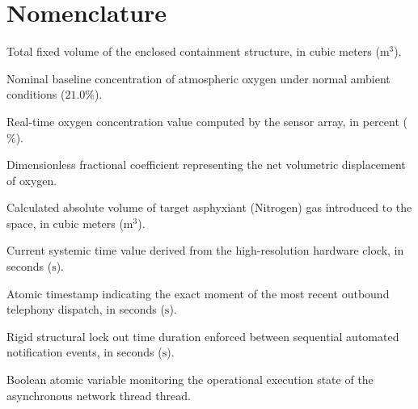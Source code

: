 \section{Nomenclature}
\label{sec:nomenclature}
\begin{list}{}{\setlength{\leftmargin}{1.5cm}\setlength{\labelwidth}{1.2cm}\setlength{\itemsep}{2pt}}

    \item[\boldmath$V_{\text{room}}$] 
    Total fixed volume of the enclosed containment structure, in cubic meters ($\text{m}^3$).
    
    \item[\boldmath$O_{2,\text{baseline}}$] 
    Nominal baseline concentration of atmospheric oxygen under normal ambient conditions ($21.0\%$).
    
    \item[\boldmath$O_{2,\text{measured}}$] 
    Real-time oxygen concentration value computed by the sensor array, in percent ($\%$).
    
    \item[\boldmath$\Delta\Phi_{O_2}$] 
    Dimensionless fractional coefficient representing the net volumetric displacement of oxygen.
    
    \item[\boldmath$V_{N_2,\text{released}}$] 
    Calculated absolute volume of target asphyxiant (Nitrogen) gas introduced to the space, in cubic meters ($\text{m}^3$).
    
    \item[\boldmath$t_{\text{current}}$] 
    Current systemic time value derived from the high-resolution hardware clock, in seconds ($\text{s}$).
    
    \item[\boldmath$t_{\text{last\_call}}$] 
    Atomic timestamp indicating the exact moment of the most recent outbound telephony dispatch, in seconds ($\text{s}$).
    
    \item[\boldmath$T_{\text{cooldown}}$] 
    Rigid structural lock out time duration enforced between sequential automated notification events, in seconds ($\text{s}$).
    
    \item[\boldmath$\text{Worker}_{\text{Active}}$] 
    Boolean atomic variable monitoring the operational execution state of the asynchronous network thread thread.

\end{list}


